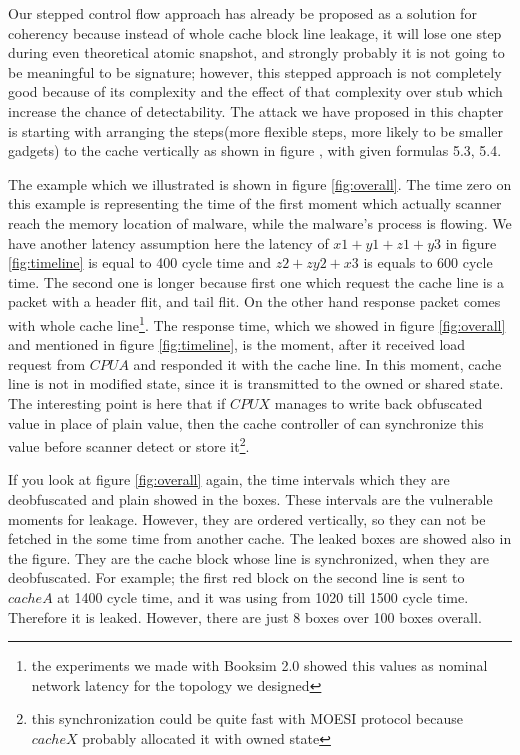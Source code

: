 	Our stepped control flow approach has already be proposed as a solution for coherency because instead of whole cache block line leakage, it will lose one step during even theoretical atomic snapshot, and strongly probably it is not going to be meaningful to be signature; however, this stepped approach is not completely good because of its complexity and the effect of that complexity over stub which increase the chance of detectability. The attack we have proposed in this chapter is starting with arranging the steps(more flexible steps, more likely to be smaller gadgets) to the cache vertically as shown in figure \cite{veriticaldirection}, with given formulas 5.3, 5.4. 

	The example which we illustrated is shown in figure \ref{fig:overall}. The time zero on this example is representing the time of the first moment which actually scanner reach the memory location of malware, while the malware's process is flowing. We have another latency assumption here the latency of $x1+y1+z1+y3$ in figure \ref{fig:timeline} is equal to 400 cycle time and $z2+zy2+x3$ is equals to 600 cycle time. The second one is longer because first one which request the cache line is a packet with a header flit, and tail flit. On the other hand response packet comes with whole cache line\footnote{the experiments we made with Booksim 2.0 showed this values as nominal network latency for the topology we designed}. The response time, which we showed in figure \ref{fig:overall} and mentioned in figure \ref{fig:timeline}, is the moment, after it received load request from $CPUA$ and responded it with the cache line. In this moment, cache line is not in modified state, since it is transmitted to the owned or shared state. The interesting point is here that if $CPUX$ manages to write back obfuscated value in place of plain value, then the cache controller of can synchronize this value before scanner detect or store it\footnote{this synchronization could be quite fast with MOESI protocol because $cacheX$ probably allocated it with owned state}. 

	If you look at figure \ref{fig:overall} again, the time intervals which they are deobfuscated and plain showed in the boxes. These intervals are the vulnerable moments for leakage. However, they are ordered vertically, so they can not be fetched in the some time from another cache. The leaked boxes are showed also in the figure. They are the cache block whose line is synchronized, when they are deobfuscated. For example; the first red block on the second line is sent to $cacheA$ at 1400 cycle time, and it was using from 1020 till 1500 cycle time. Therefore it is leaked. However, there are just 8 boxes over 100 boxes overall.


